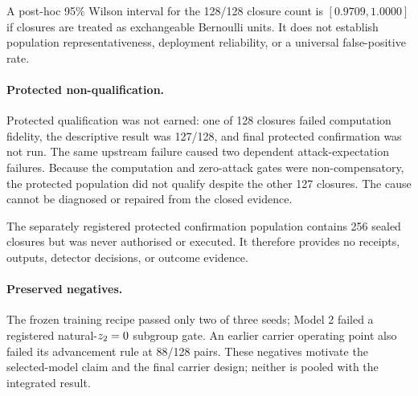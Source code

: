 A post-hoc 95\% Wilson interval for the 128/128 closure count is
$[0.9709,1.0000]$ if closures are treated as exchangeable Bernoulli units. It
does not establish population representativeness, deployment reliability, or
a universal false-positive rate.

\paragraph{Protected non-qualification.}
Protected qualification was not earned: one of 128 closures failed computation
fidelity, the descriptive result was 127/128, and final protected confirmation
was not run. The same upstream failure caused two dependent attack-expectation
failures. Because the computation and zero-attack gates were
non-compensatory, the protected population did not qualify despite the other
127 closures. The cause cannot be diagnosed or repaired from the closed
evidence.

The separately registered protected confirmation population contains 256
sealed closures but was never authorised or executed. It therefore provides no
receipts, outputs, detector decisions, or outcome evidence.

\paragraph{Preserved negatives.}
The frozen training recipe passed only two of three seeds; Model 2 failed a
registered natural-$z_2=0$ subgroup gate. An earlier carrier operating point
also failed its advancement rule at 88/128 pairs. These negatives motivate the
selected-model claim and the final carrier design; neither is pooled with the
integrated result.

